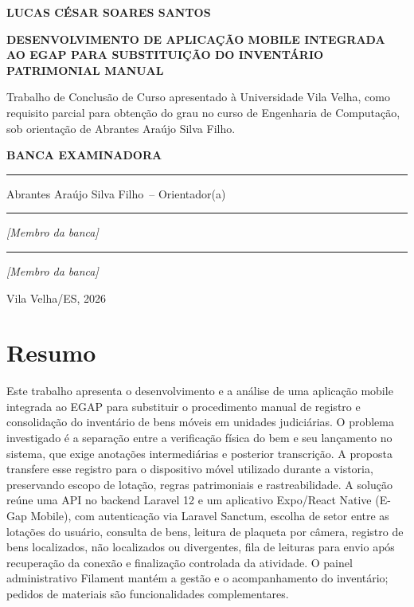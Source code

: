 \documentclass[12pt,a4paper]{article}
\newcommand{\autor}{Lucas César Soares Santos}
\newcommand{\instituicao}{Universidade Vila Velha}
\newcommand{\localdefesa}{Vila Velha/ES}
\newcommand{\anodefesa}{2026}
\newcommand{\curso}{Engenharia de Computação}
\newcommand{\orientador}{Abrantes Araújo Silva Filho}
\newcommand{\titulotrabalho}{Desenvolvimento de Aplicação Mobile Integrada ao EGAP para Substituição do Inventário Patrimonial Manual}
\begin{document}
\begin{titlepage}
    \centering
    {\large\textbf{\MakeUppercase{\autor}}\par}
    \vspace{1.8cm}
    {\Large\bfseries\MakeUppercase{\titulotrabalho}\par}
    \vspace{1.8cm}
    \begin{minipage}{\textwidth}
        Trabalho de Conclusão de Curso apresentado à \instituicao, como requisito parcial para obtenção do grau no curso de \curso, sob orientação de \orientador.
    \end{minipage}
    \vspace{1.5cm}

    {\large\textbf{BANCA EXAMINADORA}\par}
    \vspace{1.3cm}
    \rule{10cm}{0.4pt}\par
    \orientador\ -- Orientador(a)\par
    \vspace{1.1cm}
    \rule{10cm}{0.4pt}\par
    \textit{[Membro da banca]}\par
    \vspace{1.1cm}
    \rule{10cm}{0.4pt}\par
    \textit{[Membro da banca]}\par
    \vfill
    {\large\localdefesa, \anodefesa\par}
\end{titlepage}


\hypersetup{pageanchor=true}
\section*{Resumo}

Este trabalho apresenta o desenvolvimento e a análise de uma aplicação mobile integrada ao EGAP para substituir o procedimento manual de registro e consolidação do inventário de bens móveis em unidades judiciárias. O problema investigado é a separação entre a verificação física do bem e seu lançamento no sistema, que exige anotações intermediárias e posterior transcrição. A proposta transfere esse registro para o dispositivo móvel utilizado durante a vistoria, preservando escopo de lotação, regras patrimoniais e rastreabilidade. A solução reúne uma API no backend Laravel 12 e um aplicativo Expo/React Native (E-Gap Mobile), com autenticação via Laravel Sanctum, escolha de setor entre as lotações do usuário, consulta de bens, leitura de plaqueta por câmera, registro de bens localizados, não localizados ou divergentes, fila de leituras para envio após recuperação da conexão e finalização controlada da atividade. O painel administrativo Filament mantém a gestão e o acompanhamento do inventário; pedidos de materiais são funcionalidades complementares.
\end{document}
